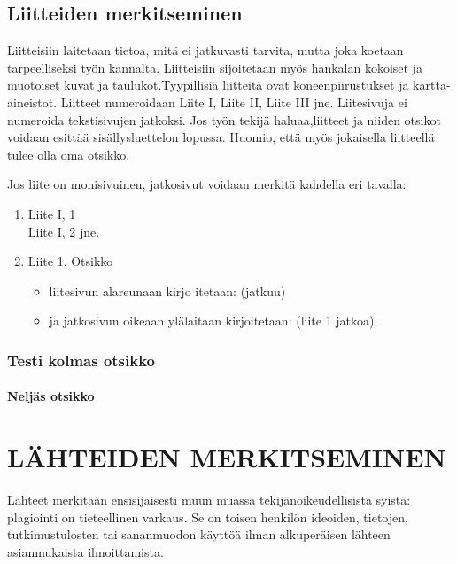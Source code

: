 \documentclass{LUT_pohja}[2016/03/09 LUT Dippa Pohja]
\begin{document}
\subsection{Liitteiden merkitseminen}
Liitteisiin laitetaan tietoa, mitä ei jatkuvasti tarvita, mutta joka koetaan tarpeelliseksi työn kannalta. Liitteisiin sijoitetaan myös hankalan kokoiset ja muotoiset kuvat ja taulukot.Tyypillisiä liitteitä ovat koneenpiirustukset ja kartta-aineistot. Liitteet numeroidaan Liite I, Liite II, Liite III jne. Liitesivuja ei numeroida tekstisivujen jatkoksi. Jos työn tekijä haluaa,liitteet ja niiden otsikot voidaan esittää sisällysluettelon lopussa. Huomio, että myös jokaisella liitteellä tulee olla oma otsikko.\par

Jos liite on monisivuinen, jatkosivut voidaan merkitä kahdella eri tavalla:
\begin{enumerate}[1),noitemsep, nolistsep, topsep=-1em]
\item Liite I, 1\\
Liite I, 2 jne. 
\item Liite 1. Otsikko
\begin{itemize}
\item liitesivun alareunaan kirjo itetaan: (jatkuu) 
\item ja jatkosivun oikeaan ylälaitaan kirjoitetaan: (liite 1 jatkoa).
\end{itemize}
\end{enumerate}
\subsubsection{Testi kolmas otsikko}
\paragraph{Neljäs otsikko}%


\newpage
\section{LÄHTEIDEN MERKITSEMINEN}
Lähteet merkitään ensisijaisesti muun muassa tekijänoikeudellisista syistä: plagiointi on tieteellinen varkaus. Se on toisen  henkilön  ideoiden,  tietojen,  tutkimustulosten tai sananmuodon käyttöä ilman alkuperäisen lähteen asianmukaista ilmoittamista. \cite[s. 110-111.]{Hirsjarvi05}\par
\end{document}
